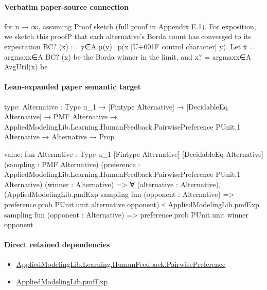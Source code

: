 \documentclass[10pt]{article}
\begin{document}
\paragraph{Verbatim paper-source connection}
\begin{ReviewVerbatim}
for n → ∞, assuming
Proof sketch (full proof in Appendix E.1). For exposition, we sketch this proofP
that each alternative’s Borda count has converged to its expectation BC? (x) := y∈A µ(y)·p(x [U+001F control character] y).
Let x̂ = argmaxx∈A BC? (x) be the Borda winner in the limit, and x? = argmaxx∈A AvgUtil(x) be
\end{ReviewVerbatim}



\paragraph{Lean-expanded paper semantic target}
\begin{ReviewVerbatim}
type:
{Alternative : Type u_1} →
  [Fintype Alternative] →
    [DecidableEq Alternative] →
      PMF Alternative →
        AppliedModelingLib.Learning.HumanFeedback.PairwisePreference PUnit.{1} Alternative → Alternative → Prop

value:
fun {Alternative : Type u_1} [Fintype Alternative] [DecidableEq Alternative] (sampling : PMF Alternative)
    (preference : AppliedModelingLib.Learning.HumanFeedback.PairwisePreference PUnit.{1} Alternative)
    (winner : Alternative) =>
  ∀ (alternative : Alternative),
    (AppliedModelingLib.pmfExp sampling fun (opponent : Alternative) =>
        preference.prob PUnit.unit alternative opponent) ≤
      AppliedModelingLib.pmfExp sampling fun (opponent : Alternative) => preference.prob PUnit.unit winner opponent
\end{ReviewVerbatim}

\paragraph{Direct retained dependencies}
\begin{itemize}\raggedright
\item \hyperlink{library-prerequisite-7e2db20cf087d9ba}{Applied\allowbreak{}Modeling\allowbreak{}Lib.\allowbreak{}Learning.\allowbreak{}Human\allowbreak{}Feedback.\allowbreak{}Pairwise\allowbreak{}Preference}
\item \hyperlink{governing-declaration-8e4b4389a4f6454b}{Applied\allowbreak{}Modeling\allowbreak{}Lib.\allowbreak{}pmf\allowbreak{}Exp}
\end{itemize}
\end{document}
